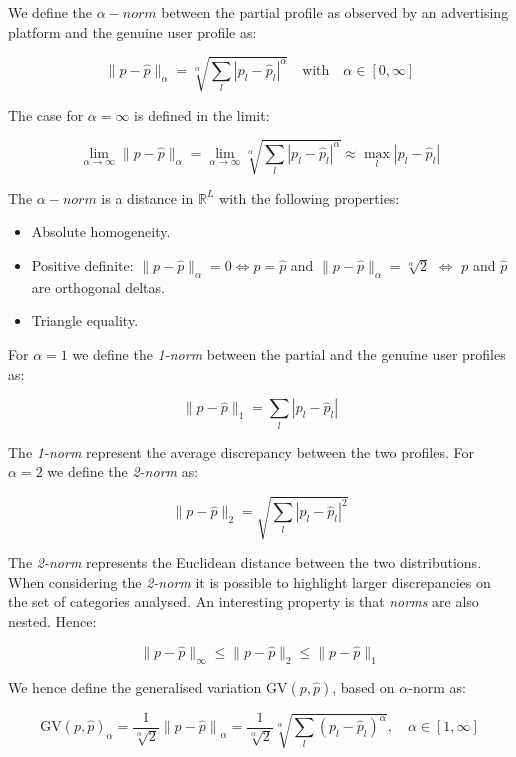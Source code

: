 We define the $\alpha-norm$ between the partial profile as observed by an advertising platform and the genuine user profile as: 

$$ \| p - \hat{p} \|_\alpha = \sqrt[\alpha]{\sum_l{ {| p_l - \hat{p}_l |}^\alpha }} \quad  \text{with} \quad  \alpha \in [0, \infty] $$ 

The case for $\alpha = \infty$ is defined in the limit: 

$$\lim_{\alpha\to\infty} \| p - \hat{p} \|_\alpha = \lim_{\alpha\to\infty} \sqrt[\alpha]{\sum_l{ {| p_l - \hat{p}_l |}^\alpha }} \approx \max_l { | p_l - \hat{p}_l | } $$

The $\alpha-norm$ is a distance in $\mathbb{R}^L$ with the following properties:

\begin{itemize}
 \item Absolute homogeneity.
 \item Positive definite: $ \| p - \hat{p} \|_\alpha = 0 \Leftrightarrow p = \hat{p} $ and $ \| p - \hat{p} \|_\alpha = \sqrt[\alpha]{2}$ $\Leftrightarrow$  $p$ and $\hat{p}$ are orthogonal deltas. 
 \item Triangle equality.
\end{itemize}

For $\alpha = 1$ we define the \emph{1-norm} between the partial and the genuine user profiles as: 

$$ \| p - \hat{p} \|_1 = \sum_l{ | p_{l} - \hat{p}_{l} | }  $$

The \emph{1-norm} represent the average discrepancy between the two profiles. For $\alpha = 2$ we define the \emph{2-norm} as:

$$ \| p - \hat{p} \|_2 = \sqrt{\sum_l{ {| {p_{l} - \hat{p}_{l}} |}^2 }} $$

The \emph{2-norm} represents the Euclidean distance between the two distributions. When considering the \emph{2-norm} it is possible to highlight larger discrepancies on the set of categories analysed. An interesting property is that \emph{norms} are also nested. Hence:

$$ \| p - \hat{p} \|_\infty \leqslant \| p - \hat{p} \|_2 \leqslant \| p - \hat{p} \|_1 $$

We hence define the generalised variation $\text{GV}(p, \hat{p})$, based on $\alpha$-norm as:

$$ \text{GV}(p, \hat{p})_\alpha = \frac {1} {\sqrt[\alpha]{2}}  {\| p - \hat{p} \|}_\alpha =  \frac {1} {\sqrt[\alpha]{2}} \sqrt[\alpha]{{ \sum_l{ ( p_{l} - \hat{p}_{l})^\alpha } }} ,\quad  \alpha \in [1,\infty]$$

